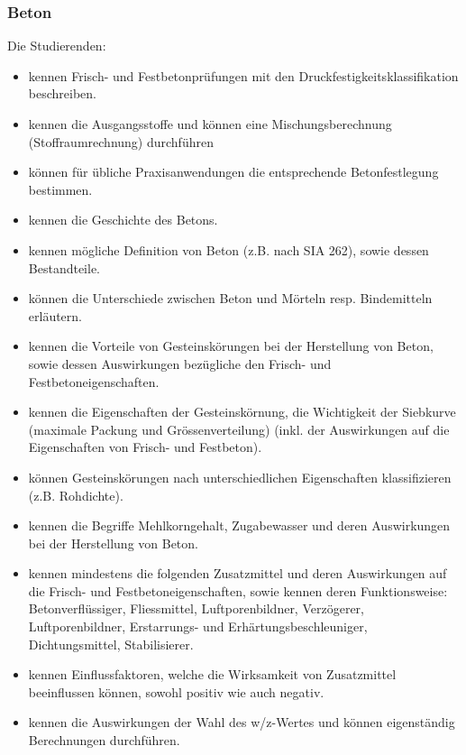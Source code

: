 \subsubsection*{Beton}
Die Studierenden: 

\begin{itemize}[noitemsep]
	\item kennen Frisch- und Festbetonprüfungen mit den Druckfestigkeitsklassifikation beschreiben.
	\item kennen die Ausgangsstoffe und können eine Mischungsberechnung (Stoffraumrechnung) durchführen
	\item können für übliche Praxisanwendungen die entsprechende Betonfestlegung bestimmen.
	\item kennen die Geschichte des Betons. 
	\item kennen mögliche Definition von Beton (z.B. nach SIA 262), sowie dessen Bestandteile.
	\item können die Unterschiede zwischen Beton und Mörteln resp. Bindemitteln erläutern. 
	\item kennen die Vorteile von Gesteinskörungen bei der Herstellung von Beton, sowie dessen Auswirkungen bezügliche den Frisch- und Festbetoneigenschaften.
	\item kennen die Eigenschaften der Gesteinskörnung, die Wichtigkeit der Siebkurve (maximale Packung und Grössenverteilung) (inkl. der Auswirkungen auf die Eigenschaften von Frisch- und Festbeton).
	\item können Gesteinskörungen nach unterschiedlichen Eigenschaften klassifizieren (z.B. Rohdichte). 
	\item kennen die Begriffe Mehlkorngehalt, Zugabewasser und deren Auswirkungen bei der Herstellung von Beton.
	\item kennen mindestens die folgenden Zusatzmittel und deren Auswirkungen auf die Frisch- und Festbetoneigenschaften, sowie kennen deren Funktionsweise: Betonverflüssiger, Fliessmittel, Luftporenbildner, Verzögerer, Luftporenbildner, Erstarrungs- und Erhärtungsbeschleuniger, Dichtungsmittel, Stabilisierer. 
	\item kennen Einflussfaktoren, welche die Wirksamkeit von Zusatzmittel beeinflussen können, sowohl positiv wie auch negativ.
	\item kennen die Auswirkungen der Wahl des w/z-Wertes und können eigenständig Berechnungen durchführen.
\end{itemize}